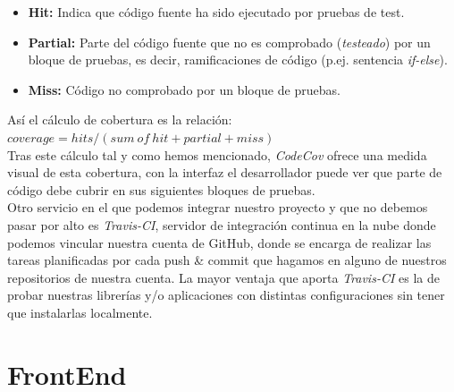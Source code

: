 \begin{itemize}
    \item \textbf{Hit: } Indica que código fuente ha sido ejecutado por pruebas de test.
    \item \textbf{Partial: } Parte del código fuente que no es comprobado (\emph{testeado}) por un bloque de pruebas, es decir, ramificaciones de código (p.ej. sentencia \emph{if-else}).
    \item \textbf{Miss: } Código no comprobado por un bloque de pruebas.
\end{itemize}
Así el cálculo de cobertura es la relación: $coverage = hits / (sum\ of\ hit + partial + miss)$ \\
Tras este cálculo tal y como hemos mencionado, \emph{CodeCov} ofrece una medida visual de esta cobertura, con la interfaz el desarrollador puede ver que parte de código debe cubrir en sus siguientes bloques de pruebas. \\
Otro servicio en el que podemos integrar nuestro proyecto y que no debemos pasar por alto es \emph{Travis-CI}, servidor de integración continua en la nube donde podemos vincular nuestra cuenta de GitHub, donde se encarga de realizar las tareas planificadas por cada push \& commit que hagamos en alguno de nuestros repositorios de nuestra cuenta. La mayor ventaja que aporta \emph{Travis-CI} es la de probar nuestras librerías y/o aplicaciones con distintas configuraciones sin tener que instalarlas localmente.


\section{FrontEnd}
\label{sec:frontEnd}
